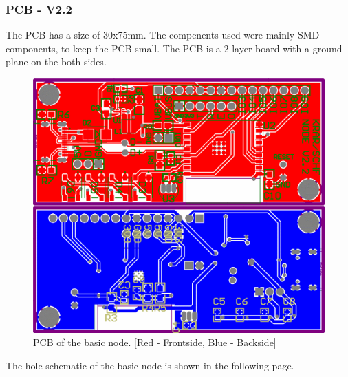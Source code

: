     \subsubsection{PCB - V2.2}

        The PCB has a size of 30x75mm. The compenents used were mainly SMD components, 
        to keep the PCB small. The PCB is a 2-layer board with a ground plane on the
        both sides.

    \begin{figure}[H]
        \centering
        \includegraphics[width=1\textwidth]{assets/HW/PCB-NODE-V2.2.png}
        \caption{PCB of the basic node. [Red - Frontside, Blue - Backside]}
    \end{figure}	

    


        The hole schematic of the basic node is shown in the following page.
    
 
